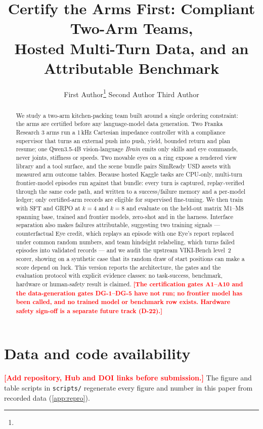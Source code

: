 \documentclass[11pt]{article}
\title{\textbf{Certify the Arms First: Compliant Two-Arm Teams,\\
Hosted Multi-Turn Data, and an Attributable Benchmark}\\[2pt]
{\normalsize\todo{working title: confirm}}}
\author{%
  First Author\thanks{\todo{placeholder names: replace with the real authors, affiliations and corresponding author}}
  \quad Second Author
  \quad Third Author\\[4pt]
  \todo{affiliations}
}
\date{\todo{submission date and venue (template and page limit not yet chosen)}}
\newcommand{\todo}[1]{\textcolor{red}{\textbf{[#1]}}}
\begin{document}
\maketitle

\begin{abstract}
We study a two-arm kitchen-packing team built around a single ordering constraint: the arms are certified before any language-model data generation.
Two Franka Research 3 arms run a 1\,kHz Cartesian impedance controller with a compliance supervisor that turns an external push into push, yield, bounded return and plan resume; one Qwen3.5-4B vision-language \emph{Brain} emits only skills and eye commands, never joints, stiffness or speeds.
Two movable eyes on a ring expose a rendered view library and a tool surface, and the scene bundle pairs SimReady USD assets with measured arm outcome tables.
Because hosted Kaggle tasks are CPU-only, multi-turn frontier-model episodes run against that bundle: every turn is captured, replay-verified through the same code path, and written to a success/failure memory and a per-model ledger; only certified-arm records are eligible for supervised fine-tuning.
We then train with SFT and GRPO at $k=4$ and $k=8$ and evaluate on the held-out matrix M1--M8 spanning base, trained and frontier models, zero-shot and in the harness.
Interface separation also makes failures attributable, suggesting two training signals --- counterfactual Eye credit, which replays an episode with one Eye's report replaced under common random numbers, and team hindsight relabeling, which turns failed episodes into validated records --- and we audit the upstream VIKI-Bench level~2 scorer, showing on a synthetic case that its random draw of start positions can make a score depend on luck.
This version reports the architecture, the gates and the evaluation protocol with explicit evidence classes: no task-success, benchmark, hardware or human-safety result is claimed.
\todo{The certification gates A1--A10 and the data-generation gates DG-1--DG-5 have not run; no frontier model has been called, and no trained model or benchmark row exists. Hardware safety sign-off is a separate future track (D-22).}
\end{abstract}








\section*{Data and code availability}
\todo{Add repository, Hub and DOI links before submission.} The figure and table scripts in \texttt{scripts/} regenerate every figure and number in this paper from recorded data (\cref{app:repro}).

\FloatBarrier



\appendix

\end{document}
